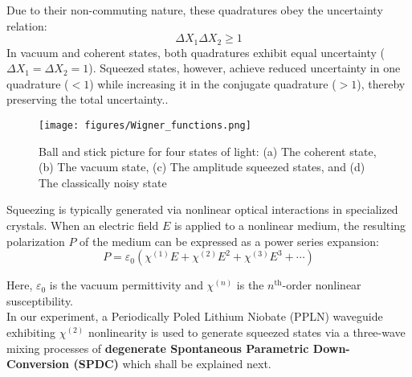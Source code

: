 \documentclass[colorlinks=true,pdfstartview=FitV,linkcolor=blue,
citecolor=red,urlcolor=magenta]{ligodoc}
\begin{document}
Due to their non-commuting nature, these quadratures obey the uncertainty relation:
\begin{equation}
    \Delta X_1 \Delta X_2 \geq 1
\end{equation}
In vacuum and coherent states, both quadratures exhibit equal uncertainty ($\Delta X_1= \Delta X_2=1$). Squeezed states, however, achieve reduced uncertainty in one quadrature ($<1$) while increasing it in the conjugate quadrature ($>1$), thereby preserving the total uncertainty.\cite{saleh_teich}.\\
\begin{figure}[H]
    \centering
    \texttt{[image: figures/Wigner\_functions.png]}
   \caption{  Ball and stick picture for four states of light: (a) The coherent state, (b) The vacuum state, (c)
The amplitude squeezed states, and (d) The classically noisy state\cite{mckenzie} }
    \label{fig:enter-label}
\end{figure}



Squeezing is typically generated via nonlinear optical interactions in specialized crystals. When an electric field $E$ is applied to a nonlinear medium, the resulting polarization $P$ of the medium can be expressed as a power series expansion:
\begin{equation}
    P = \varepsilon_0 \left( \chi^{(1)} E + \chi^{(2)} E^2 + \chi^{(3)} E^3 + \cdots \right)
\end{equation}

Here, $\varepsilon_0$ is the vacuum permittivity and $\chi^{(n)}$ is the $n^{\text{th}}$-order nonlinear susceptibility.\\

In our experiment, a Periodically Poled Lithium Niobate (PPLN) waveguide exhibiting $\chi^{(2)}$ nonlinearity is used to generate squeezed states via a three-wave mixing processes of \textbf{degenerate Spontaneous Parametric Down-Conversion (SPDC)} which shall be explained next.\\
\end{document}
